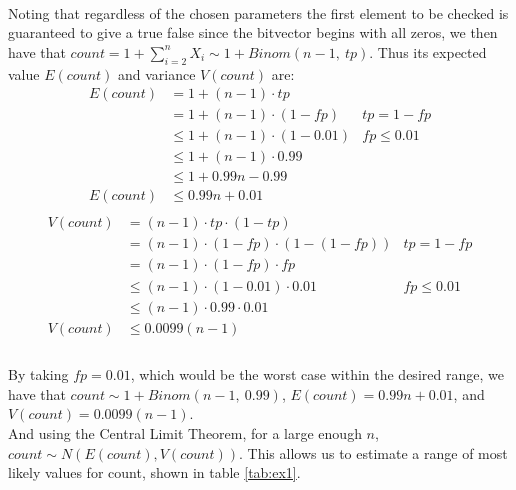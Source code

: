 \documentclass[../main.tex]{subfiles}
\begin{document}
\paragraph{} Noting that regardless of the chosen parameters the first element to be checked is guaranteed to give a true false since the bitvector begins with all zeros, we then have that \(count = 1 + \sum_{i = 2}^{n}X_{i} \sim 1 + Binom(n - 1,\ tp)\). Thus its expected value \(E(count)\) and variance \(V(count)\) are:
\begin{align*}
  E(count) &= 1 + (n - 1) \cdot tp \\
           &= 1 + (n - 1) \cdot (1 - fp) & tp = 1 - fp \\
           &\leq 1 + (n - 1) \cdot (1 - 0.01) & fp \leq 0.01 \\
           &\leq 1 + (n - 1) \cdot 0.99 \\
           &\leq 1 + 0.99n - 0.99 \\
  E(count) &\leq 0.99n + 0.01 \\
\end{align*}
\begin{align*}
  V(count) &= (n - 1) \cdot tp \cdot (1 - tp) \\
           &= (n - 1) \cdot (1 - fp) \cdot (1 - (1 - fp)) & tp = 1 - fp \\
           &= (n - 1) \cdot (1 - fp) \cdot fp \\
           &\leq (n - 1) \cdot (1 - 0.01) \cdot 0.01 & fp \leq 0.01 \\
           &\leq (n - 1) \cdot 0.99 \cdot 0.01 \\
  V(count) &\leq 0.0099(n - 1) \\
\end{align*}

\paragraph{} By taking \(fp = 0.01\), which would be the worst case within the desired range, we have that \(count \sim 1 + Binom(n-1,\ 0.99)\), \(E(count) = 0.99n + 0.01\), and \(V(count) = 0.0099(n-1)\). \\
And using the Central Limit Theorem, for a large enough \(n\), \(count \sim N(E(count), V(count))\). This allows us to estimate a range of most likely values for count, shown in table \ref{tab:ex1}.
\end{document}
